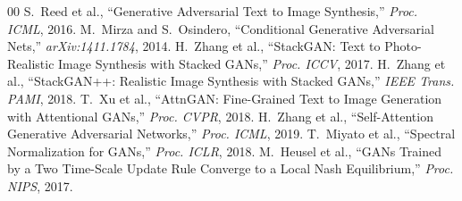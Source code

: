 \documentclass[conference]{IEEEtran}
\begin{document}
\begin{thebibliography}{00}
 S.~Reed et al., ``Generative Adversarial Text to Image Synthesis,'' \emph{Proc. ICML}, 2016.
 M.~Mirza and S.~Osindero, ``Conditional Generative Adversarial Nets,'' \emph{arXiv:1411.1784}, 2014.
 H.~Zhang et al., ``StackGAN: Text to Photo-Realistic Image Synthesis with Stacked GANs,'' \emph{Proc. ICCV}, 2017.
 H.~Zhang et al., ``StackGAN++: Realistic Image Synthesis with Stacked GANs,'' \emph{IEEE Trans. PAMI}, 2018.
 T.~Xu et al., ``AttnGAN: Fine-Grained Text to Image Generation with Attentional GANs,'' \emph{Proc. CVPR}, 2018.
 H.~Zhang et al., ``Self-Attention Generative Adversarial Networks,'' \emph{Proc. ICML}, 2019.
 T.~Miyato et al., ``Spectral Normalization for GANs,'' \emph{Proc. ICLR}, 2018.
 M.~Heusel et al., ``GANs Trained by a Two Time-Scale Update Rule Converge to a Local Nash Equilibrium,'' \emph{Proc. NIPS}, 2017.
\end{thebibliography}
\end{document}
